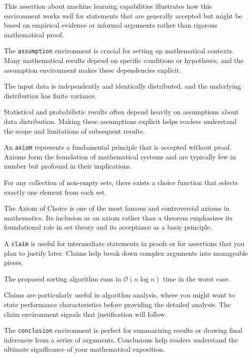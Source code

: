 \documentclass[9pt]{amsart}
\begin{document}
This assertion about machine learning capabilities illustrates how this
environment works well for statements that are generally accepted but might be
based on empirical evidence or informal arguments rather than rigorous
mathematical proof.

The \texttt{assumption} environment is crucial for setting up mathematical
contexts. Many mathematical results depend on specific conditions or
hypotheses, and the assumption environment makes these dependencies explicit.

\begin{assumption}
    The input data is independently and identically distributed, and the underlying distribution has finite variance.
\end{assumption}

Statistical and probabilistic results often depend heavily on assumptions about
data distribution. Making these assumptions explicit helps readers understand
the scope and limitations of subsequent results.

An \texttt{axiom} represents a fundamental principle that is accepted without
proof. Axioms form the foundation of mathematical systems and are typically few
in number but profound in their implications.

\begin{axiom}
    For any collection of non-empty sets, there exists a choice function that selects exactly one element from each set.
\end{axiom}

The Axiom of Choice is one of the most famous and controversial axioms in
mathematics. Its inclusion as an axiom rather than a theorem emphasizes its
foundational role in set theory and its acceptance as a basic principle.

A \texttt{claim} is useful for intermediate statements in proofs or for
assertions that you plan to justify later. Claims help break down complex
arguments into manageable pieces.

\begin{claim}
    The proposed sorting algorithm runs in $\mathcal{O}(n \log n)$ time in the worst case.
\end{claim}

Claims are particularly useful in algorithm analysis, where you might want to
state performance characteristics before providing the detailed analysis. The
claim environment signals that justification will follow.

The \texttt{conclusion} environment is perfect for summarizing results or
drawing final inferences from a series of arguments. Conclusions help readers
understand the ultimate significance of your mathematical exposition.
\end{document}
